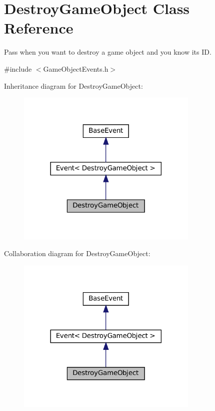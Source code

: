 \hypertarget{classDestroyGameObject}{}\section{Destroy\+Game\+Object Class Reference}
\label{classDestroyGameObject}


Pass when you want to destroy a game object and you know it\textquotesingle{}s ID.  




{\ttfamily \#include $<$Game\+Object\+Events.\+h$>$}



Inheritance diagram for Destroy\+Game\+Object\+:
\nopagebreak
\begin{figure}[H]
\begin{center}
\leavevmode
\includegraphics[width=246pt]{classDestroyGameObject__inherit__graph}
\end{center}
\end{figure}


Collaboration diagram for Destroy\+Game\+Object\+:
\nopagebreak
\begin{figure}[H]
\begin{center}
\leavevmode
\includegraphics[width=246pt]{classDestroyGameObject__coll__graph}
\end{center}
\end{figure}
